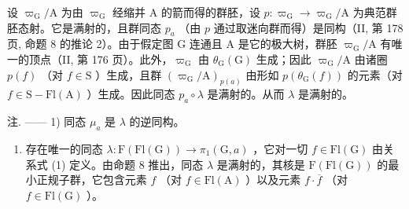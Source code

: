 设 \(\varpi_{\mathrm{G}} / \mathrm{A}\) 为由 \(\varpi_{\mathrm{G}}\) 经缩并 A 的箭而得的群胚，设 \(p\colon \varpi_{\mathrm{G}}\to \varpi_{\mathrm{G}} / \mathrm{A}\) 为典范群胚态射。它是满射的，且群同态 \(p_a\) （由 \(p\) 通过取迷向群而得）是同构（II, 第 178 页, 命题 8 的推论 2）。由于假定图 G 连通且 A 是它的极大树，群胚 \(\varpi_{\mathrm{G}} / \mathrm{A}\) 有唯一的顶点（II, 第 176 页）。此外，\(\varpi_{\mathrm{G}}\) 由 \(\theta_{\mathrm{G}}(\mathrm{G})\) 生成；因此 \(\varpi_{\mathrm{G}} / \mathrm{A}\) 由诸圈 \(p(f)\) （对 \(f\in \mathrm{S}\) ）生成，且群 \((\varpi_{\mathrm{G}} / \mathrm{A})_{p(a)}\) 由形如 \(p(\theta_{\mathrm{G}}(f))\) 的元素（对 \(f\in \mathrm{S} - \mathrm{Fl}(\mathrm{A})\) ）生成。因此同态 \(p_a\circ \lambda\) 是满射的。从而 \(\lambda\) 是满射的。

注. —— 1) 同态 \(\mu_{a}\) 是 \(\lambda\) 的逆同构。

\begin{enumerate}
\def\labelenumi{\arabic{enumi})}
\setcounter{enumi}{1}
\tightlist
\item
  存在唯一的同态 \(\lambda\colon\mathrm{F}(\mathrm{Fl}(\mathrm{G}))\to\pi_{1}(\mathrm{G},a)\) ，它对一切 \(f\in\mathrm{Fl}(\mathrm{G})\) 由关系式 (1) 定义。由命题 8 推出，同态 \(\lambda\) 是满射的，其核是 \(\mathrm{F}(\mathrm{Fl}(\mathrm{G}))\) 的最小正规子群，它包含元素 \(f\) （对 \(f\in\mathrm{Fl}(\mathrm{A})\) ）以及元素 \(f\cdot\overline{f}\) （对 \(f\in\mathrm{Fl}(\mathrm{G})\) ）。
\end{enumerate}

